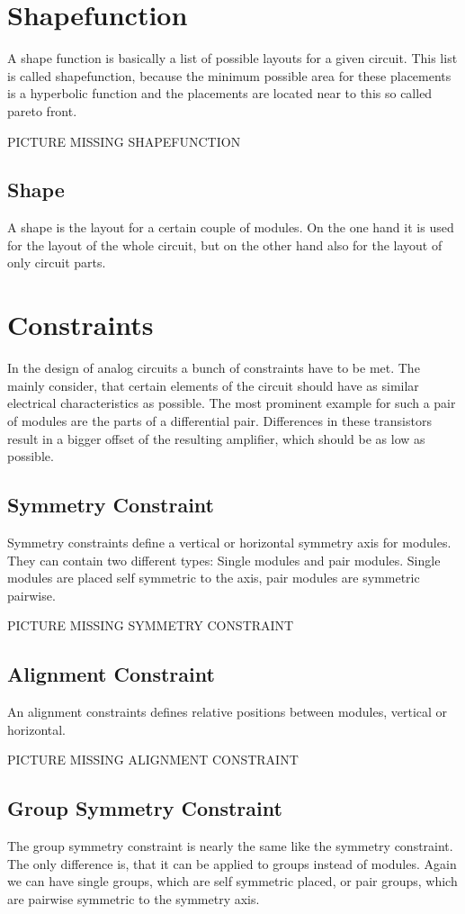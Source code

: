 \section{Shapefunction}
A shape function is basically a list of possible layouts for a given circuit. This list is called shapefunction, because the minimum possible area for these placements is a hyperbolic function and the placements are located near to this so called pareto front.

PICTURE MISSING SHAPEFUNCTION

\subsection{Shape}
A shape is the layout for a certain couple of modules. On the one hand it is used for the layout of the whole circuit, but on the other hand also for the layout of only circuit parts.

\section{Constraints}
In the design of analog circuits a bunch of constraints have to be met. The mainly consider, that certain elements of the circuit should have as similar electrical characteristics as possible. The most prominent example for such a pair of modules are the parts of a differential pair. Differences in these transistors result in a bigger offset of the resulting amplifier, which should be as low as possible.
\subsection{Symmetry Constraint}
Symmetry constraints define a vertical or horizontal symmetry axis for modules. They can contain two different types: Single modules and pair modules. Single modules are placed self symmetric to the axis, pair modules are symmetric pairwise.

PICTURE MISSING SYMMETRY CONSTRAINT

\subsection{Alignment Constraint}
An alignment constraints defines relative positions between modules, vertical or horizontal.

PICTURE MISSING ALIGNMENT CONSTRAINT

\subsection{Group Symmetry Constraint}
The group symmetry constraint is nearly the same like the symmetry constraint. The only difference is, that it can be applied to groups instead of modules. Again we can have single groups, which are self symmetric placed, or pair groups, which are pairwise symmetric to the symmetry axis.

